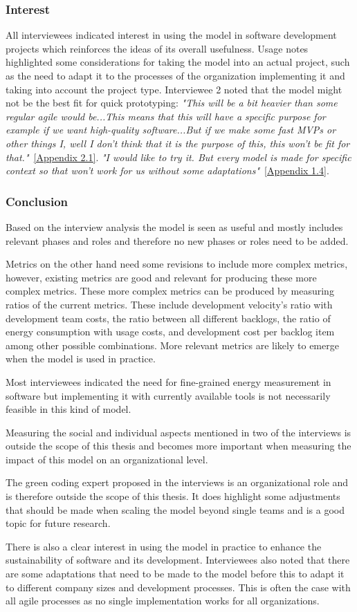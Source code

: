 \subsubsection{Interest}
All interviewees indicated interest in using the model in software development projects which reinforces the ideas of its overall usefulness. Usage notes highlighted some considerations for taking the model into an actual project, such as the need to adapt it to the processes of the organization implementing it and taking into account the project type. Interviewee 2 noted that the model might not be the best fit for quick prototyping: \textit{"This will be a bit heavier than some regular agile would be...This means that this will have a specific purpose for example if we want high-quality software...But if we make some fast MVPs or other things I, well I don't think that it is the purpose of this, this won't be fit for that."}~\hyperref[i21]{[Appendix 2.1]}. \textit{"I would like to try it. But every model is made for specific context so that won't work for us without some adaptations"}~\hyperref[i14]{[Appendix 1.4]}.

\subsubsection{Conclusion}
Based on the interview analysis the model is seen as useful and mostly includes relevant phases and roles and therefore no new phases or roles need to be added. 

Metrics on the other hand need some revisions to include more complex metrics, however, existing metrics are good and relevant for producing these more complex metrics. These more complex metrics can be produced by measuring ratios of the current metrics. These include development velocity's ratio with development team costs, the ratio between all different backlogs, the ratio of energy consumption with usage costs, and development cost per backlog item among other possible combinations. More relevant metrics are likely to emerge when the model is used in practice. 

Most interviewees indicated the need for fine-grained energy measurement in software but implementing it with currently available tools is not necessarily feasible in this kind of model.

Measuring the social and individual aspects mentioned in two of the interviews is outside the scope of this thesis and becomes more important when measuring the impact of this model on an organizational level.

The green coding expert proposed in the interviews is an organizational role and is therefore outside the scope of this thesis. It does highlight some adjustments that should be made when scaling the model beyond single teams and is a good topic for future research.

There is also a clear interest in using the model in practice to enhance the sustainability of software and its development. Interviewees also noted that there are some adaptations that need to be made to the model before this to adapt it to different company sizes and development processes. This is often the case with all agile processes as no single implementation works for all organizations.